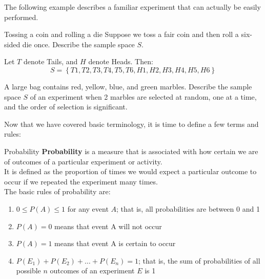 The following example describes a familiar experiment that can actually be easily performed.

\begin{example}[https://www.youtube.com/watch?v=hD3-sONaoHk&list=PLfmpjsIzhzts14-9s5QixRje97EI2oeMF&index=2]{Tossing a coin and rolling a die}
Suppose we toss a fair coin and then roll a six-sided die once. Describe the sample space $S$.

\sol

 Let $T$ denote Tails, and $H$ denote Heads. Then:
\[  S = \boxed{\left\{T 1, T 2, T 3, T 4, T 5, T 6, H 1, H 2, H 3, H 4, H 5, H 6 \right\}} \]
\end{example}

\begin{try}
A large bag contains red, yellow, blue, and green marbles. Describe the sample space $S$ of an experiment when 2 marbles are selected at random, one at a time, and the order of selection is significant.
\end{try}
\vfill
\pagebreak

Now that we have covered basic terminology, it is time to define a few terms and rules:
\begin{proc}{Probability}
\textbf{Probability} is a measure that is associated with how certain we are of outcomes of a particular experiment or activity. \\ 

It is defined as the proportion of times we would expect a particular outcome to occur if we repeated the experiment many times.\\

The basic rules of probability are:
\begin{enumerate}
	\item $0 \leq P(A) \leq 1$ for any event $A$; that is, all probabilities are between 0 and 1
	\item $P(A) = 0$ means that event A will not occur
	\item $P(A) = 1$ means that event A is certain to occur
	\item $P(E_1) + P(E_2) + \dots + P(E_n) = 1 $; that is, the sum of probabilities of all possible $n$ outcomes of an experiment $E$ is 1
\end{enumerate}
\end{proc}


